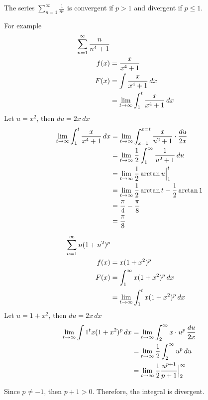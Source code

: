 \begin{lemma}[P-series]
  The series \(\sum_{n=1}^{\infty} \frac{1}{n^p}\) is convergent if \(p > 1\) and divergent if \(p \leq 1\).
\end{lemma}

For example
\begin{equation}
  \nonumber
  \begin{aligned}
    \sum_{n=1}^{\infty} \frac{n}{n^4 + 1} \\
    f(x) &= \frac{x}{x^4 + 1} \\
    F(x) &= \int \frac{x}{x^4 + 1} \, dx \\
    &= \lim_{t \to \infty} \int_{1}^{t} \frac{x}{x^4 + 1} \, dx \\
  \end{aligned}
\end{equation}
Let $u = x^2$, then $du = 2x \, dx$
\begin{equation}
  \nonumber
  \begin{aligned}
    \lim_{t \to \infty} \int_{1}^{t} \frac{x}{x^4 + 1} \, dx &= \lim_{t \to \infty} \int_{x=1}^{x=t} \frac{x}{u^2+1} \cdot \frac{du}{2x} \\
    &= \lim_{t \to \infty} \frac{1}{2} \int_{1}^{\infty} \frac{1}{u^2 + 1} \, du \\
    &= \lim_{t \to \infty} \frac{1}{2} \arctan{u} \Big|_{1}^{t} \\
    &= \lim_{t \to \infty} \frac{1}{2} \arctan{t} - \frac{1}{2} \arctan{1} \\
    &= \frac{\pi}{4} - \frac{\pi}{8} \\
    &= \frac{\pi}{8}
  \end{aligned}
\end{equation}

\begin{equation}
  \nonumber
  \begin{aligned}
    \sum_{n=1}^{\infty} n(1 + n^2)^p \\
    f(x) &= x(1 + x^2)^p \\
    F(x) &= \int_{1}^{\infty} x(1 + x^2)^p \, dx \\
    &= \lim_{t \to \infty} \int_{1}^{t} x(1 + x^2)^p \, dx \\
  \end{aligned}
\end{equation}
Let $u = 1 + x^2$, then $du = 2x \, dx$
\begin{equation}
  \nonumber
  \begin{aligned}
    \lim_{t \to \infty} \int{1}^{t} x(1 + x^2)^p \, dx &= \lim_{t \to \infty} \int_{2}^{\infty} x \cdot u^p \, \frac{du}{2x} \\
    &= \lim_{t \to \infty} \frac{1}{2} \int_{2}^{\infty} u^p \, du \\
    &= \lim_{t \to \infty} \frac{1}{2} \frac{u^{p + 1}}{p + 1}\Big|_{2}^{\infty} \\
  \end{aligned}
\end{equation}

Since $p \neq -1$, then $p + 1 > 0$. Therefore, the integral is divergent.